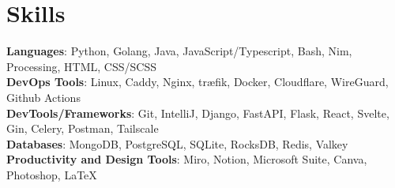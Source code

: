 \documentclass[letterpaper,11pt]{article}
\begin{document}
\section{Skills}
\small{
\textbf{Languages}{: Python, Golang, Java, JavaScript/Typescript, Bash, Nim, Processing, HTML, CSS/SCSS} \\
\textbf{DevOps Tools}{: Linux, Caddy, Nginx, træfik, Docker, Cloudflare, WireGuard, Github Actions} \\
\textbf{DevTools/Frameworks}{: Git, IntelliJ, Django, FastAPI, Flask, React, Svelte, Gin, Celery, Postman, Tailscale} \\
\textbf{Databases}{: MongoDB, PostgreSQL, SQLite, RocksDB, Redis, Valkey} \\
\textbf{Productivity and Design Tools}{: Miro, Notion, Microsoft Suite, Canva, Photoshop, LaTeX} \\
}
\end{document}
